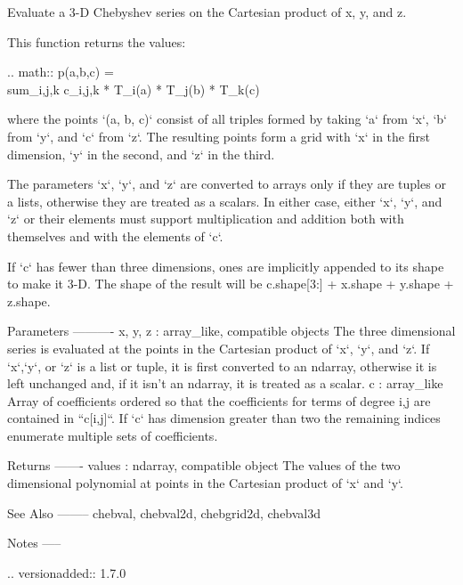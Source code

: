 \begin{DoxyVerb}Evaluate a 3-D Chebyshev series on the Cartesian product of x, y, and z.

This function returns the values:

.. math:: p(a,b,c) = \\sum_{i,j,k} c_{i,j,k} * T_i(a) * T_j(b) * T_k(c)

where the points `(a, b, c)` consist of all triples formed by taking
`a` from `x`, `b` from `y`, and `c` from `z`. The resulting points form
a grid with `x` in the first dimension, `y` in the second, and `z` in
the third.

The parameters `x`, `y`, and `z` are converted to arrays only if they
are tuples or a lists, otherwise they are treated as a scalars. In
either case, either `x`, `y`, and `z` or their elements must support
multiplication and addition both with themselves and with the elements
of `c`.

If `c` has fewer than three dimensions, ones are implicitly appended to
its shape to make it 3-D. The shape of the result will be c.shape[3:] +
x.shape + y.shape + z.shape.

Parameters
----------
x, y, z : array_like, compatible objects
    The three dimensional series is evaluated at the points in the
    Cartesian product of `x`, `y`, and `z`.  If `x`,`y`, or `z` is a
    list or tuple, it is first converted to an ndarray, otherwise it is
    left unchanged and, if it isn't an ndarray, it is treated as a
    scalar.
c : array_like
    Array of coefficients ordered so that the coefficients for terms of
    degree i,j are contained in ``c[i,j]``. If `c` has dimension
    greater than two the remaining indices enumerate multiple sets of
    coefficients.

Returns
-------
values : ndarray, compatible object
    The values of the two dimensional polynomial at points in the Cartesian
    product of `x` and `y`.

See Also
--------
chebval, chebval2d, chebgrid2d, chebval3d

Notes
-----

.. versionadded:: 1.7.0\end{DoxyVerb}
 \mbox{\label{namespacenumpy_1_1polynomial_1_1chebyshev_aa40d9c6238fb99b12076206699a57f27}} 
